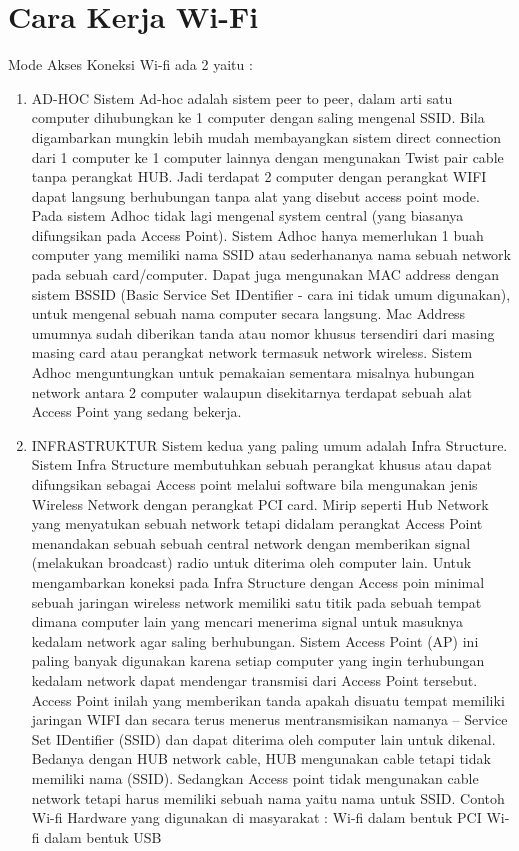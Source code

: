  \section {Cara Kerja Wi-Fi}
 Mode Akses Koneksi Wi-fi ada 2 yaitu :
\begin{enumerate}
\item AD-HOC
Sistem Ad-hoc adalah sistem peer to peer, dalam arti satu computer dihubungkan ke 1 computer dengan saling mengenal SSID. Bila digambarkan mungkin lebih mudah membayangkan sistem direct connection dari 1 computer ke 1 computer lainnya dengan mengunakan Twist pair cable tanpa perangkat HUB. Jadi terdapat 2 computer dengan perangkat WIFI dapat langsung berhubungan tanpa alat yang disebut access point mode. Pada sistem Adhoc tidak lagi mengenal system central (yang biasanya difungsikan pada Access Point). Sistem Adhoc hanya memerlukan 1 buah computer yang memiliki nama SSID atau sederhananya nama sebuah network pada sebuah card/computer. Dapat juga mengunakan MAC address dengan sistem BSSID (Basic Service Set IDentifier - cara ini tidak umum digunakan), untuk mengenal sebuah nama computer secara langsung. Mac Address umumnya sudah diberikan tanda atau nomor khusus tersendiri dari masing masing card atau 
perangkat network termasuk network wireless. Sistem Adhoc menguntungkan untuk pemakaian sementara misalnya hubungan network antara 2 computer walaupun disekitarnya terdapat sebuah alat Access Point yang sedang bekerja.
\item INFRASTRUKTUR
Sistem kedua yang paling umum adalah Infra Structure. Sistem Infra Structure membutuhkan sebuah perangkat khusus atau dapat difungsikan sebagai Access point melalui software bila mengunakan jenis Wireless Network dengan perangkat PCI card. Mirip seperti Hub Network yang menyatukan sebuah network tetapi didalam perangkat Access Point menandakan sebuah sebuah central network dengan memberikan signal (melakukan broadcast) radio untuk diterima oleh computer lain. Untuk mengambarkan koneksi pada Infra Structure dengan Access poin minimal sebuah jaringan wireless network memiliki satu titik pada sebuah tempat dimana computer lain yang mencari menerima signal untuk masuknya kedalam network agar saling berhubungan. Sistem Access Point (AP) ini  paling banyak digunakan karena setiap computer yang ingin terhubungan kedalam network dapat mendengar transmisi dari Access Point tersebut. Access Point inilah yang memberikan
 tanda apakah disuatu tempat memiliki jaringan WIFI dan secara terus menerus mentransmisikan namanya – Service Set IDentifier (SSID) dan dapat diterima oleh computer lain untuk dikenal. Bedanya dengan HUB network cable, HUB mengunakan cable tetapi tidak memiliki nama (SSID). Sedangkan Access point tidak mengunakan cable network tetapi harus memiliki sebuah nama yaitu nama untuk SSID. Contoh Wi-fi Hardware yang digunakan di masyarakat : Wi-fi dalam bentuk PCI Wi-fi dalam bentuk USB
\end{enumerate}


